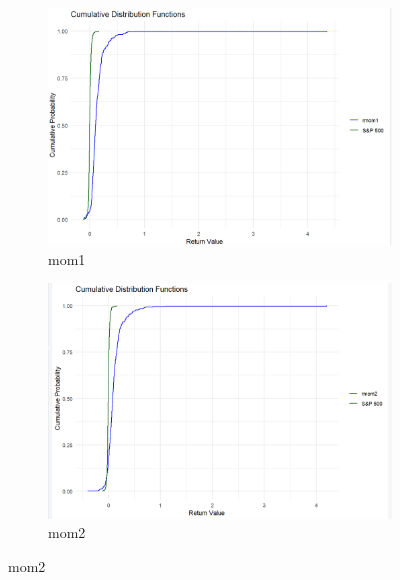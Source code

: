 \documentclass{article}
\begin{document}
\begin{figure}[H]
    \centering
    \begin{subfigure}{0.45\textwidth}
        \centering
        \includegraphics[width=\textwidth]{25.png}
        \caption{mom1}
        \label{fig:image25}
    \end{subfigure}
    \hspace{0.05\textwidth}
    \begin{subfigure}{0.45\textwidth}
        \centering
        \includegraphics[width=\textwidth]{26.png}
        \caption{mom2}
        \label{fig:image26}
    \end{subfigure}


\end{figure}
\end{document}
